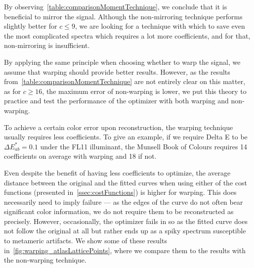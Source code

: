 By observing~\cref{table:comparisonMomentTechnique}, we conclude that it is beneficial to mirror the signal. Although the non-mirroring technique performs slightly better for $c \le 9$, we are looking for a technique with which to save even the most complicated spectra which requires a lot more coefficients, and for that, non-mirroring is insufficient.

By applying the same principle when choosing whether to warp the signal, we assume that warping should provide better results. However, as the results from~\cref{table:comparisonMomentTechnique} are not entirely clear on this matter, as for $c \ge 16$, the maximum error of non-warping is lower, we put this theory to practice and test the performance of the optimizer with both warping and non-warping. 

To achieve a certain color error upon reconstruction, the warping technique usually requires less coefficients. To give an example, if we require Delta E to be $\Delta E_{ab}^*=0.1$ under the FL11 illuminant, the Munsell Book of Colours requires 14 coefficients on average with warping and 18 if not.

Even despite the benefit of having less coefficients to optimize, the average distance between the original and the fitted curves when using either of the cost functions (presented in~\cref{ssec:costFunctions}) is higher for warping. This does necessarily need to imply failure --- as the edges of the curve do not often bear significant color information, we do not require them to be reconstructed as precisely. However, occasionally, the optimizer fails in so as the fitted curve does not follow the original at all but rather ends up as a spiky spectrum susceptible to metameric artifacts. We show some of these results in~\cref{fig:warping_atlasLatticePoints}, where we compare them to the results with the non-warping technique.

